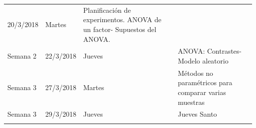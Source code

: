 \documentclass[]{book}
\theoremstyle{definition}
\theoremstyle{definition}
\theoremstyle{definition}
\theoremstyle{remark}
\begin{document}
\begin{longtable}[]{@{}llll@{}}
\begin{minipage}[t]{0.07\columnwidth}
20/3/2018\strut
\end{minipage} & \begin{minipage}[t]{0.05\columnwidth}\raggedright
Martes\strut
\end{minipage} & \begin{minipage}[t]{0.69\columnwidth}\raggedright
Planificación de experimentos. ANOVA de un factor- Supuestos del
ANOVA.\strut
\end{minipage}\tabularnewline
\begin{minipage}[t]{0.07\columnwidth}\raggedright
Semana 2\strut
\end{minipage} & \begin{minipage}[t]{0.07\columnwidth}\raggedright
22/3/2018\strut
\end{minipage} & \begin{minipage}[t]{0.05\columnwidth}\raggedright
Jueves\strut
\end{minipage} & \begin{minipage}[t]{0.69\columnwidth}\raggedright
ANOVA: Contrastes- Modelo aleatorio\strut
\end{minipage}\tabularnewline
\begin{minipage}[t]{0.07\columnwidth}\raggedright
Semana 3\strut
\end{minipage} & \begin{minipage}[t]{0.07\columnwidth}\raggedright
27/3/2018\strut
\end{minipage} & \begin{minipage}[t]{0.05\columnwidth}\raggedright
Martes\strut
\end{minipage} & \begin{minipage}[t]{0.69\columnwidth}\raggedright
Métodos no paramétricos para comparar varias muestras\strut
\end{minipage}\tabularnewline
\begin{minipage}[t]{0.07\columnwidth}\raggedright
Semana 3\strut
\end{minipage} & \begin{minipage}[t]{0.07\columnwidth}\raggedright
29/3/2018\strut
\end{minipage} & \begin{minipage}[t]{0.05\columnwidth}\raggedright
Jueves\strut
\end{minipage} & \begin{minipage}[t]{0.69\columnwidth}\raggedright
Jueves Santo\strut
\end{minipage}\tabularnewline
\begin{minipage}[t]{0.07\columnwidth}\raggedright

\end{minipage}
\end{longtable}
\end{document}
